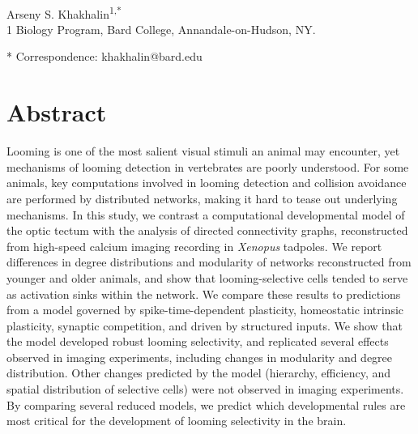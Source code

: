 \documentclass{article}
\begin{document}



\begin{flushleft}
{\Large
\textbf{}
}
\newline
\\
Arseny S. Khakhalin\textsuperscript{1,*}
\\
\bigskip
{1} Biology Program, Bard College, Annandale-on-Hudson, NY. 

* Correspondence: khakhalin@bard.edu






\section*{Abstract}
Looming is one of the most salient visual stimuli an animal may encounter, yet mechanisms of looming detection in vertebrates are poorly understood. For some animals, key computations involved in looming detection and collision avoidance are performed by distributed networks, making it hard to tease out underlying mechanisms. In this study, we contrast a computational developmental model of the optic tectum with the analysis of directed connectivity graphs, reconstructed from high-speed calcium imaging recording in \textit{Xenopus} tadpoles. We report differences in degree distributions and modularity of networks reconstructed from younger and older animals, and show that looming-selective cells tended to serve as activation sinks within the network. We compare these results to predictions from a model governed by spike-time-dependent plasticity, homeostatic intrinsic plasticity, synaptic competition, and driven by structured inputs. We show that the model developed robust looming selectivity, and replicated several effects observed in imaging experiments, including changes in modularity and degree distribution. Other changes predicted by the model (hierarchy, efficiency, and spatial distribution of selective cells) were not observed in imaging experiments. By comparing several reduced models, we predict which developmental rules are most critical for the development of looming selectivity in the brain.
\bigskip

\end{flushleft} %
\end{document}
